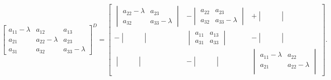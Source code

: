 \documentclass[../main.tex]{subfiles}
\begin{document}
\begin{dowod}
\[
\begin{bmatrix}
a_{11} - \lambda & a_{12} & a_{13}\\
a_{21} & a_{22} - \lambda & a_{23}\\
a_{31} & a_{32} & a_{33} - \lambda
\end{bmatrix}^D =
\begin{bmatrix}
    \begin{vmatrix}
        a_{22} - \lambda & a_{23}\\
        a_{32} & a_{33} - \lambda
    \end{vmatrix}
    & -
    \begin{vmatrix}
        a_{22} & a_{23}\\
        a_{32} & a_{33} - \lambda
    \end{vmatrix}
    & +
    \begin{vmatrix}
        &&\\
        &&\\
    \end{vmatrix}\\
    -
    \begin{vmatrix}
     &&\\
     &&\\
    \end{vmatrix}
    &
    \begin{vmatrix}
        a_{11} & a_{13}\\
        a_{31} & a_{33}
    \end{vmatrix}
    & -
    \begin{vmatrix}
      &&\\
      &&\\
    \end{vmatrix}\\
    \begin{vmatrix}
        &&\\
        &&\\
    \end{vmatrix}
    & -
    \begin{vmatrix}
       &&\\
       &&\\
    \end{vmatrix}
    &
    \begin{vmatrix}
        a_{11} - \lambda & a_{22}\\
        a_{21} & a_{22} - \lambda\\
    \end{vmatrix}

\end{bmatrix}
.\]


\end{dowod}
\end{document}
